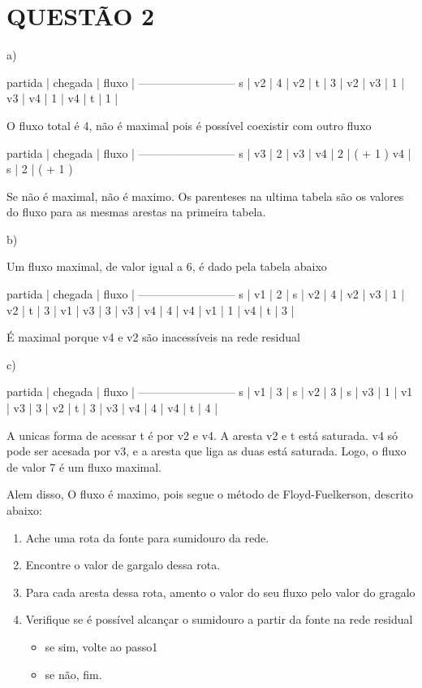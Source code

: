 \documentclass{article}
\begin{document}
\section{QUESTÃO 2}

a) 

partida | chegada | fluxo |
--------------------------
   s    |    v2   |   4   |
   v2   |    t    |   3   |
   v2   |    v3   |   1   |
   v3   |    v4   |   1   | 
   v4   |    t    |   1   |

O fluxo total é 4, não é maximal pois é possível coexistir com outro fluxo

partida | chegada | fluxo |
--------------------------
   s    |    v3   |   2   |
   v3   |    v4   |   2   | ( + 1 )
   v4   |    s    |   2   | ( + 1 )

Se não é maximal, não é maximo. Os parenteses na ultima tabela são os valores do
fluxo para as mesmas arestas na primeira tabela.

b)

Um fluxo maximal, de valor igual a 6, é dado pela tabela abaixo

partida | chegada | fluxo |
--------------------------
   s    |    v1   |   2   |
   s    |    v2   |   4   |
   v2   |    v3   |   1   |
   v2   |    t    |   3   |
   v1   |    v3   |   3   |
   v3   |    v4   |   4   |
   v4   |    v1   |   1   |
   v4   |    t    |   3   |

É maximal porque v4 e v2 são inacessíveis na rede residual

c)

partida | chegada | fluxo |
--------------------------
   s    |    v1   |   3   |
   s    |    v2   |   3   |
   s    |    v3   |   1   |
   v1   |    v3   |   3   |
   v2   |    t    |   3   |
   v3   |    v4   |   4   |
   v4   |    t    |   4   |

 A unicas forma de acessar t é por v2 e v4. A aresta v2 e t está saturada. v4 só pode ser acesada por v3, e a aresta que liga as duas está saturada. Logo, o fluxo de valor 7 é um fluxo maximal.

Alem disso, O fluxo é maximo, pois segue o método de Floyd-Fuelkerson, descrito abaixo:

\begin{enumerate}
\item Ache uma rota da fonte para sumidouro da rede.
\item Encontre o valor de gargalo dessa rota.
\item Para cada aresta dessa rota, amento o valor do seu fluxo pelo valor do gragalo
\item Verifique se é possível alcançar o sumidouro a partir da fonte na rede residual
   \begin{itemize}
   \item se sim, volte ao passo1
   \item se não, fim.
   \end{itemize}
\end{enumerate}
\end{document}
